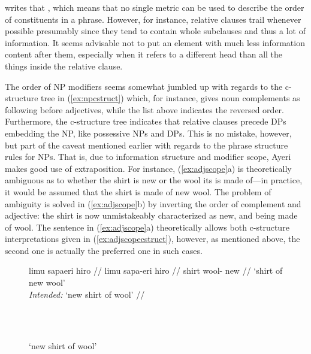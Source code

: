 \citet{wasow1997} writes that , which means
that no single metric can be used to describe the order of constituents in a
phrase. However, for instance, relative clauses trail whenever possible
presumably since they tend to contain whole subclauses and thus a lot of
information. It seems advisable not to put an element with much less
information content after them, especially when it refers to a different head
than all the things inside the relative clause.

The order of NP modifiers seems somewhat jumbled up with regards to the
c-structure tree in (\ref{ex:npcstruct}) which, for instance, gives noun
complements as following  before adjectives, while the list above
indicates the reversed order. Furthermore, the c-structure tree indicates that
relative clauses precede DPs embedding the NP, like possessive NPs and DPs.
This is no mistake, however, but part of the caveat mentioned earlier with
regards to the phrase structure rules for NPs. That is, due to information
structure and modifier scope, Ayeri makes good use of extraposition. For
instance, (\ref{ex:adjscope}a) is theoretically ambiguous as to whether the
shirt is new or the wool its is made of---in practice, it would be assumed that
the shirt is made of new wool. The problem of ambiguity is solved in
(\ref{ex:adjscope}b) by inverting the order of complement and adjective: the
shirt is now unmistakeably characterized as new, and being made of wool. The
sentence in (\ref{ex:adjscope}a) theoretically allows both c-structure
interpretations given in (\ref{ex:adjscopecstruct}), however, as mentioned
above, the second one is actually the preferred one in such cases.

\begin{figure}[h]
\ex{}\label{ex:adjscope}
\begin{minipage}[t]{.5\remaining}
\tl\quad\label{ex:adjscope_1}\ljudge\excl%
\begingl
	\gla limu sapaeri hiro //
	\glb limu sapa-eri hiro //
	\glc shirt wool-\Ins{} new //
	\glft `shirt of new wool'\\
		\textit{Intended:} `new shirt of wool' //
\endgl
\end{minipage}
~
\begin{minipage}[t]{.5\remaining}
\tl\quad\label{ex:adjscope_2}%
\begin{minipage}[t]{\linewidth}
	 \\
	`new shirt of wool'
\end{minipage}
\end{minipage}
\xe
\end{figure}

